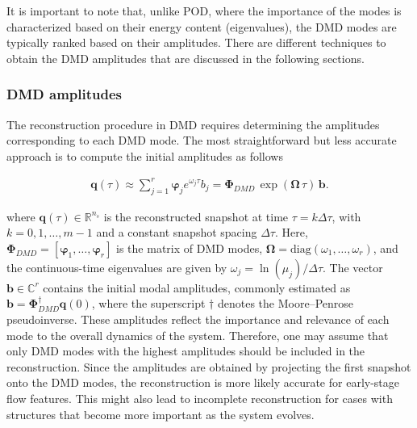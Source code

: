 \documentclass[a4paper,fleqn]{cas-sc}
\begin{document}
	It is important to note that, unlike POD, where the importance of the modes is characterized based on their energy content (eigenvalues), the DMD modes are typically ranked based on their amplitudes. There are different techniques to obtain the DMD amplitudes that are discussed in the following sections.
	
	\subsubsection{DMD amplitudes}
	\label{DMD amplitudes}
	
	The reconstruction procedure in DMD requires determining the amplitudes corresponding to each DMD mode. The most straightforward but less accurate approach is to compute the initial amplitudes as follows \cite{Kutz2016}
	
	\begin{align}
		\mathbf{q}(\tau)\approx \sum_{j=1}^{r} \boldsymbol{\varphi}_j e^{\omega_j \tau} b_j = \mathbf{\Phi}_{DMD}\,\exp (\mathbf{\Omega}\, \tau)\,\mathbf{b}.
		\label{eq 10}
	\end{align}
	
	\noindent where $\mathbf{q}(\tau)\in\mathbb{R}^{n_s}$ is the reconstructed snapshot at time $\tau=k\Delta\tau$, with $k=0,1,\ldots,m-1$ and a constant snapshot spacing $\Delta\tau$. Here, $\mathbf{\Phi}_{DMD}=[\boldsymbol{\varphi}_1,\ldots,\boldsymbol{\varphi}_r]$ is the matrix of DMD modes, $\mathbf{\Omega}=\mathrm{diag}(\omega_1,\ldots,\omega_r)$, and the continuous-time eigenvalues are given by $\omega_j=\ln(\mu_j)/\Delta\tau$. The vector $\mathbf{b}\in\mathbb{C}^{r}$ contains the initial modal amplitudes, commonly estimated as $\mathbf{b}=\mathbf{\Phi}_{DMD}^{\dagger}\mathbf{q}(0)$, where the superscript $\dagger$ denotes the Moore--Penrose pseudoinverse. These amplitudes reflect the importance and relevance of each mode to the overall dynamics of the system. Therefore, one may assume that only DMD modes with the highest amplitudes should be included in the reconstruction. Since the amplitudes are obtained by projecting the first snapshot onto the DMD modes, the reconstruction is more likely accurate for early-stage flow features. This might also lead to incomplete reconstruction for cases with structures that become more important as the system evolves. 
	
\end{document}
